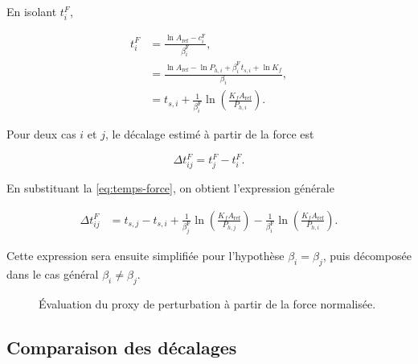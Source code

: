 \documentclass[
    11pt,
    a4paper
]{article}
\begin{document}
En isolant \(t_i^{F}\),

\begin{align}
    t_i^{F}
    &=
    \frac{\ln A_{\mathrm{ref}}-c_i^{\mathrm{F}}}{\beta_i^{\mathrm{F}}},
    \nonumber\\
    &=
    \frac{
        \ln A_{\mathrm{ref}}
        -
        \ln P_{h,i}
        +
        \beta_i^{\mathrm{F}} t_{s,i}
        +
        \ln K_f
    }{\beta_i},
    \nonumber\\
    &=
    t_{s,i}
    +
    \frac{1}{\beta_i^{\mathrm{F}}}
    \ln\left(
        \frac{K_f A_{\mathrm{ref}}}{P_{h,i}}
    \right).
    \label{eq:temps-force}
\end{align}

Pour deux cas \(i\) et \(j\), le décalage estimé à partir de la force est

\begin{equation}
    \Delta t_{ij}^{F}
    =
    t_j^{F}-t_i^{F}.
    \label{eq:decalage-force}
\end{equation}

En substituant la \ref{eq:temps-force}, on obtient l’expression générale

\begin{align}
    \Delta t_{ij}^{F}
    &=
    t_{s,j}-t_{s,i}
    +
    \frac{1}{\beta_j^{\mathrm{F}}}
    \ln\left(
        \frac{K_f A_{\mathrm{ref}}}{P_{h,j}}
    \right)
    -
    \frac{1}{\beta_i^{\mathrm{F}}}
    \ln\left(
        \frac{K_f A_{\mathrm{ref}}}{P_{h,i}}
    \right).
    \label{eq:decalage-force-general}
\end{align}

Cette expression sera ensuite simplifiée pour l’hypothèse
\(\beta_i=\beta_j\), puis décomposée dans le cas général
\(\beta_i\neq\beta_j\).

\begin{figure}[H]
    \centering
    \caption{Évaluation du proxy de perturbation à partir de la force normalisée.}
    \label{fig:proxy-force}
\end{figure}

\subsection{Comparaison des décalages}
\label{subsec:comparaison-decalages}
\end{document}
